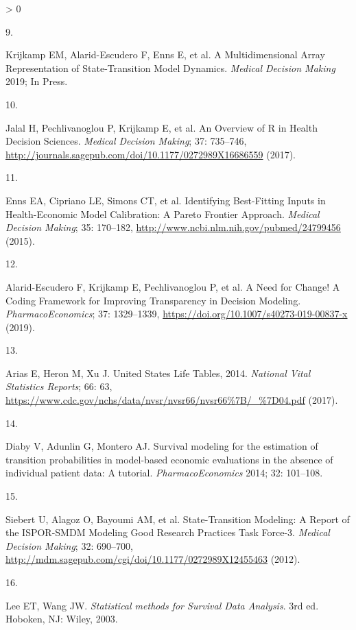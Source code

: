 \documentclass[
]{article}
\newlength{\cslhangindent}
\newlength{\csllabelwidth}
\newenvironment{CSLReferences}[2] %
 {%
  \setlength{\parindent}{0pt}
  \ifodd #1 \everypar{\setlength{\hangindent}{\cslhangindent}}\ignorespaces\fi
  \ifnum #2 > 0
  \setlength{\parskip}{#2\baselineskip}
  \fi
 }%
 {}
\newcommand{\CSLLeftMargin}[1]{\parbox[t]{\csllabelwidth}{#1}}
\newcommand{\CSLRightInline}[1]{\parbox[t]{\linewidth - \csllabelwidth}{#1}\break}
\begin{document}
\begin{CSLReferences}{0}{0}
\leavevmode\hypertarget{ref-Krijkamp2019}{}%
\CSLLeftMargin{9. }
\CSLRightInline{Krijkamp EM, Alarid-Escudero F, Enns E, et al. {A Multidimensional Array Representation of State-Transition Model Dynamics}. \emph{Medical Decision Making} 2019; In Press.}

\leavevmode\hypertarget{ref-Jalal2017b}{}%
\CSLLeftMargin{10. }
\CSLRightInline{Jalal H, Pechlivanoglou P, Krijkamp E, et al. {An Overview of R in Health Decision Sciences}. \emph{Medical Decision Making}; 37: 735--746, \url{http://journals.sagepub.com/doi/10.1177/0272989X16686559} (2017).}

\leavevmode\hypertarget{ref-Enns2015e}{}%
\CSLLeftMargin{11. }
\CSLRightInline{Enns EA, Cipriano LE, Simons CT, et al. {Identifying Best-Fitting Inputs in Health-Economic Model Calibration: A Pareto Frontier Approach}. \emph{Medical Decision Making}; 35: 170--182, \url{http://www.ncbi.nlm.nih.gov/pubmed/24799456} (2015).}

\leavevmode\hypertarget{ref-Alarid-Escudero2019e}{}%
\CSLLeftMargin{12. }
\CSLRightInline{Alarid-Escudero F, Krijkamp E, Pechlivanoglou P, et al. {A Need for Change! A Coding Framework for Improving Transparency in Decision Modeling}. \emph{PharmacoEconomics}; 37: 1329--1339, \url{https://doi.org/10.1007/s40273-019-00837-x} (2019).}

\leavevmode\hypertarget{ref-Arias2017}{}%
\CSLLeftMargin{13. }
\CSLRightInline{Arias E, Heron M, Xu J. {United States Life Tables, 2014}. \emph{National Vital Statistics Reports}; 66: 63, \url{https://www.cdc.gov/nchs/data/nvsr/nvsr66/nvsr66\%7B/_\%7D04.pdf} (2017).}

\leavevmode\hypertarget{ref-Diaby2014}{}%
\CSLLeftMargin{14. }
\CSLRightInline{Diaby V, Adunlin G, Montero AJ. {Survival modeling for the estimation of transition probabilities in model-based economic evaluations in the absence of individual patient data: A tutorial}. \emph{PharmacoEconomics} 2014; 32: 101--108.}

\leavevmode\hypertarget{ref-Siebert2012c}{}%
\CSLLeftMargin{15. }
\CSLRightInline{Siebert U, Alagoz O, Bayoumi AM, et al. {State-Transition Modeling: A Report of the ISPOR-SMDM Modeling Good Research Practices Task Force-3}. \emph{Medical Decision Making}; 32: 690--700, \url{http://mdm.sagepub.com/cgi/doi/10.1177/0272989X12455463} (2012).}

\leavevmode\hypertarget{ref-Lee2003a}{}%
\CSLLeftMargin{16. }
\CSLRightInline{Lee ET, Wang JW. \emph{{Statistical methods for Survival Data Analysis}}. 3rd ed. Hoboken, NJ: Wiley, 2003.}


\end{CSLReferences}
\end{document}

